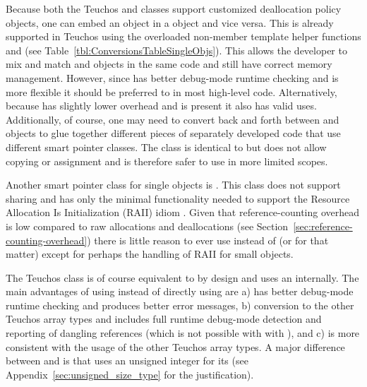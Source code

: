 \documentclass[pdf,ps2pdf,11pt]{SANDreport}
\begin{document}
Because both the Teuchos {} and {}
classes support customized deallocation policy objects, one can embed
an {} object in a {} object and vice
versa.  This is already supported in Teuchos using the overloaded
non-member template helper functions {} and {} (see Table~\ref{tbl:ConversionsTableSingleObjs}).  This
allows the developer to mix and match {} and
{} objects in the same code and still have
correct memory management.  However, since {} has better
debug-mode runtime checking and is more flexible it should be
preferred to {} in most high-level code.
Alternatively, because {} has slightly lower
overhead and is present {} it also has valid uses.
Additionally, of course, one may need to convert back and forth
between {} and {} objects to glue
together different pieces of separately developed code that use
different smart pointer classes.  The class {}
is identical to {} but does not allow copying or
assignment and is therefore safer to use in more limited scopes.

Another smart pointer class for single objects is
{}.  This class does not support sharing and has
only the minimal functionality needed to support the Resource
Allocation Is Initialization (RAII) idiom {}\cite[Item
13]{C++CodingStandards05}.  Given that reference-counting overhead is
low compared to raw allocations and deallocations (see
Section~\ref{sec:reference-counting-overhead}) there is little reason
to ever use {} instead of {} (or
{} for that matter) except for perhaps the
handling of RAII for small objects.

The Teuchos class {} is of course equivalent to
{} by design and uses an {}
internally.  The main advantages of using {} instead of
directly using {} are a) {} has better
debug-mode runtime checking and produces better error messages, b)
conversion to the other Teuchos array types {} and
{} includes full runtime debug-mode detection and
reporting of dangling references (which is not possible with with
{}), and c) is more consistent with the usage of the
other Teuchos array types.  A major difference between {}
and {} is that {} uses an unsigned integer
for its {} (see Appendix~\ref{sec:unsigned_size_type}
for the justification).
\end{document}
